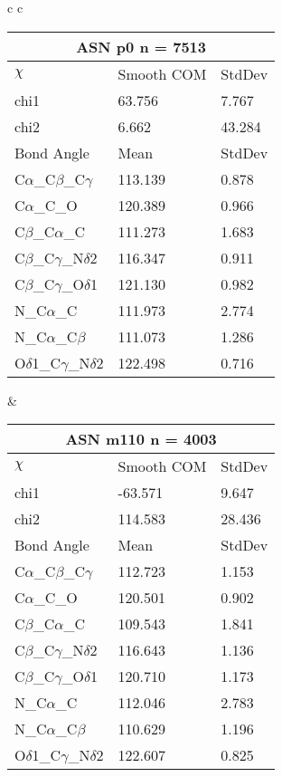 \begin{longtable}{ c c }

  \begin{tabular}{ l l l }
  \toprule
  \multicolumn{3}{c}{ASN \textbf{p0} n = 7513} \\ \toprule
  $\chi$       & Smooth COM & StdDev \\ \midrule
  chi1 & 63.756 & 7.767 \\ 
  chi2 & 6.662 & 43.284 \\ \midrule
  Bond Angle   & Mean     & StdDev \\ \midrule
  C$\alpha$\_C$\beta$\_C$\gamma$ & 113.139 & 0.878\\
  C$\alpha$\_C\_O & 120.389 & 0.966\\
  C$\beta$\_C$\alpha$\_C & 111.273 & 1.683\\
  C$\beta$\_C$\gamma$\_N$\delta$2 & 116.347 & 0.911\\
  C$\beta$\_C$\gamma$\_O$\delta$1 & 121.130 & 0.982\\
  N\_C$\alpha$\_C & 111.973 & 2.774\\
  N\_C$\alpha$\_C$\beta$ & 111.073 & 1.286\\
  O$\delta$1\_C$\gamma$\_N$\delta$2 & 122.498 & 0.716\\
  \bottomrule
  \end{tabular}
  &
  \begin{tabular}{ l l l }
  \toprule
  \multicolumn{3}{c}{ASN \textbf{m110} n = 4003} \\ \toprule
  $\chi$       & Smooth COM & StdDev \\ \midrule
  chi1 & -63.571 & 9.647 \\ 
  chi2 & 114.583 & 28.436 \\ \midrule
  Bond Angle   & Mean     & StdDev \\ \midrule
  C$\alpha$\_C$\beta$\_C$\gamma$ & 112.723 & 1.153\\
  C$\alpha$\_C\_O & 120.501 & 0.902\\
  C$\beta$\_C$\alpha$\_C & 109.543 & 1.841\\
  C$\beta$\_C$\gamma$\_N$\delta$2 & 116.643 & 1.136\\
  C$\beta$\_C$\gamma$\_O$\delta$1 & 120.710 & 1.173\\
  N\_C$\alpha$\_C & 112.046 & 2.783\\
  N\_C$\alpha$\_C$\beta$ & 110.629 & 1.196\\
  O$\delta$1\_C$\gamma$\_N$\delta$2 & 122.607 & 0.825\\
  \bottomrule
  \end{tabular}

\end{longtable}
